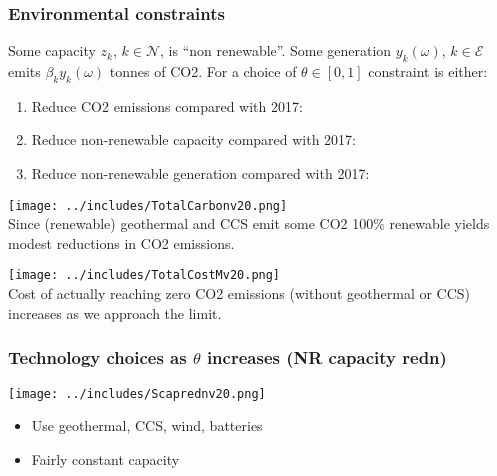 \documentclass[xcolor=dvipsnames]{beamer}
\newcommand{\expect}{\mathbb{E}}
\newcommand{\blue}[1]{{\color{blue} #1}}
\newcommand{\green}[1]{{\color{OliveGreen!100} #1}}
\newcommand{\orange}[1]{{\color{orange} #1}}
\begin{document}
\begin{frame}
  \frametitle{Environmental constraints}
Some capacity $z_k$, $k \in \mathcal{N}$, is ``non renewable''.
Some generation $y_k (\omega)$, $k \in \mathcal{E}$ emits $\beta_k y_k
(\omega)$ tonnes of CO2. For a choice of $\theta \in [0, 1]$
constraint is either:
\begin{enumerate}
\item Reduce \alert{CO2 emissions} compared with 2017:
\item Reduce \alert{non-renewable capacity} compared with 2017:
\item Reduce \alert{non-renewable generation} compared with 2017:
\end{enumerate}
\end{frame}

\begin{frame}
  \centering
  \texttt{[image: ../includes/TotalCarbonv20.png]} \\
  Since (renewable) geothermal and CCS emit some CO2 100\% renewable yields modest reductions in CO2 emissions.
\end{frame}

\begin{frame}

  \centering
  \texttt{[image: ../includes/TotalCostMv20.png]} \\
  Cost of actually reaching zero CO2 emissions (without geothermal or CCS) increases as we approach the limit.
\end{frame}

\begin{frame}
  \frametitle{Technology choices as $\theta$ increases (NR capacity redn)}

  \texttt{[image: ../includes/Scaprednv20.png]} \\
  \begin{itemize}
  \item Use geothermal, CCS, wind, batteries
  \item Fairly constant capacity
  \end{itemize}
\end{frame}
\end{document}
